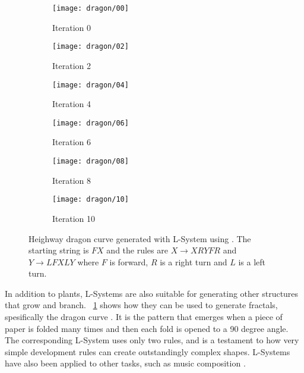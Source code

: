 \begin{figure}[!ht]
    \centering
    \begin{subfigure}{0.32\textwidth}
        \centering
        \texttt{[image: dragon/00]}
        \caption{Iteration 0}
    \end{subfigure}
    \begin{subfigure}{0.32\textwidth}
        \centering
        \texttt{[image: dragon/02]}
        \caption{Iteration 2}
    \end{subfigure}
    \begin{subfigure}{0.32\textwidth}
        \centering
        \texttt{[image: dragon/04]}
        \caption{Iteration 4}
    \end{subfigure}
    \par\bigskip
    \begin{subfigure}{0.32\textwidth}
        \centering
        \texttt{[image: dragon/06]}
        \caption{Iteration 6}
    \end{subfigure}
    \begin{subfigure}{0.32\textwidth}
        \centering
        \texttt{[image: dragon/08]}
        \caption{Iteration 8}
    \end{subfigure}
    \begin{subfigure}{0.32\textwidth}
        \centering
        \texttt{[image: dragon/10]}
        \caption{Iteration 10}
    \end{subfigure}
    \caption[Dragon curve]{
        Heighway dragon curve generated with L-System using \cite{lsystemgenerator}.
        The starting string is $FX$ and the rules are $X \rightarrow XRYFR$ and $Y \rightarrow LFXLY$ where $F$ is forward, $R$ is a right turn and $L$ is a left turn\footnotemark.
    }
    \label{fig:dragon-curve}
\end{figure}


In addition to plants, L-Systems are also suitable for generating other structures that grow and branch.
\figurename~\ref{fig:dragon-curve} shows how they can be used to generate fractals, spesifically the dragon curve \cite{gardner1967heighway}.
It is the pattern that emerges when a piece of paper is folded many times and then each fold is opened to a 90 degree angle.
The corresponding L-System uses only two rules, and is a testament to how very simple development rules can create outstandingly complex shapes.
L-Systems have also been applied to other tasks, such as music composition \cite{manousakis2006musical}.

